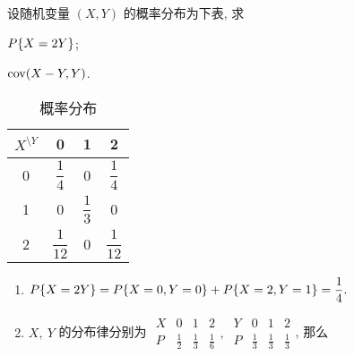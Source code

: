 \begin{example}
    设随机变量 $(X,Y)$ 的概率分布为下表, 求\newline
    \begin{enumerate*}[label=(\arabic{*})]
        \item $P\qty{X=2Y}$;
        \item $\mathrm{cov}(X-Y,Y)$.
    \end{enumerate*}
\end{example}
\begin{solution}
    \begin{minipage}{0.3\linewidth}
        \begin{table}[H]
            \centering
            \caption*{概率分布}
            \begin{tabular}{c | c c c}
                $X^{\displaystyle\setminus Y}$ & 0               & 1              & 2               \\
                \midrule
                0                              & $\dfrac{1}{4}$  & 0              & $\dfrac{1}{4}$  \\[6pt]
                1                              & 0               & $\dfrac{1}{3}$ & 0               \\[6pt]
                2                              & $\dfrac{1}{12}$ & 0              & $\dfrac{1}{12}$
            \end{tabular}
        \end{table}
    \end{minipage}\hfill
    \begin{minipage}{0.69\linewidth}
        \begin{enumerate}[label=(\arabic{*})]
            \item $P\qty{X=2Y}=P\qty{X=0,Y=0}+P\qty{X=2,Y=1}=\dfrac{1}{4}.$
            \item $X,~Y$ 的分布律分别为 $\begin{array}{c|ccc}
                          X & 0           & 1           & 2           \\\hline
                          P & \frac{1}{2} & \frac{1}{3} & \frac{1}{6}
                      \end{array},~\begin{array}{c|ccc}
                          Y & 0           & 1           & 2           \\\hline
                          P & \frac{1}{3} & \frac{1}{3} & \frac{1}{3}
                      \end{array}$, 那么

\end{enumerate}
\end{minipage}
\end{solution}
